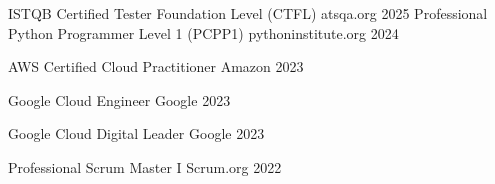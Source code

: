 

\begin{cvhonors}
  \cvhonor
    {ISTQB Certified Tester Foundation Level (CTFL)}
    {atsqa.org}
    {}
    {2025}
  \cvhonor
    {Professional Python Programmer Level 1 (PCPP1)}
    {pythoninstitute.org}
    {}
    {2024} 
    
  \cvhonor
    {AWS Certified Cloud Practitioner}
    {Amazon}
    {}
    {2023}
    
  \cvhonor
    {Google Cloud Engineer}
    {Google}
    {}
    {2023}
    
  \cvhonor
    {Google Cloud Digital Leader}
    {Google}
    {}
    {2023}

  \cvhonor
    {Professional Scrum Master I} %
    {Scrum.org} %
    {} %
    {2022} %


\end{cvhonors}
